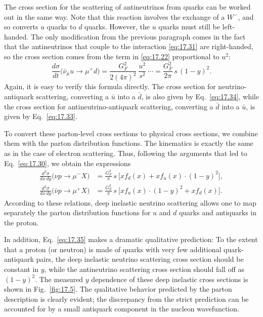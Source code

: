 The cross section for the scattering of antineutrinos from quarks can be
worked out in the same way.  Note that this reaction involves the exchange of
a $W^{-}$, and so converts $u$ quarks to $d$ quarks.  However, the $u$ quarks
must still be left-handed.  The only modification from the previous paragraph
comes in the fact that the antineutrinos that couple to the interaction
\eqref{eq:17.31} are right-handed, so the cross section comes from the term
in \eqref{eq:17.22} proportional to $u^2$:
\begin{equation}
  \frac{d\sigma}{dt}\bigl( \bar{\nu}_\mu u \to \mu^{+}d \bigr)
  = \frac{G_F^2}{2(4\pi)^2}\ \frac{u^2}{s^2}\ \cdots
  = \frac{G_F^2}{2\pi}\,s\,(1-y)^2 .
  \label{eq:17.34}
\end{equation}
Again, it is easy to verify this formula directly.  The cross section for
neutrino-antiquark scattering, converting a $\bar{u}$ into a $\bar{d}$, is
also given by Eq.~\eqref{eq:17.34}, while the cross section for
antineutrino-antiquark scattering, converting a $\bar{d}$ into a $\bar{u}$,
is given by Eq.~\eqref{eq:17.33}.

To convert these parton-level cross sections to physical cross sections, we
combine them with the parton distribution functions.  The kinematics is
exactly the same as in the case of electron scattering.  Thus, following the
arguments that led to Eq.~\eqref{eq:17.30}, we obtain the expressions
\begin{equation}
  \begin{aligned}
    \frac{d^2\sigma}{dx\,dy}\bigl( \nu p \to \mu^{-}X \bigr)
    &= \frac{G_F^2}{\pi}\,s\ \bigl[ xf_d(x) + xf_u(x)\cdot(1-y)^2 \bigr],\\
    \frac{d^2\sigma}{dx\,dy}\bigl( \bar{\nu} p \to \mu^{+}X \bigr)
    &= \frac{G_F^2}{\pi}\,s\ \bigl[ xf_u(x)\cdot(1-y)^2 + xf_d(x) \bigr].
  \end{aligned}
  \label{eq:17.35}
\end{equation}
According to these relations, deep inelastic neutrino scattering allows one to
map separately the parton distribution functions for $u$ and $d$ quarks and
antiquarks in the proton.

In addition, Eq.~\eqref{eq:17.35} makes a dramatic qualitative prediction: To
the extent that a proton (or neutron) is made of quarks with very few
additional quark-antiquark pairs, the deep inelastic neutrino scattering
cross section should be constant in $y$, while the antineutrino scattering
cross section should fall off as $(1-y)^2$.  The measured $y$ dependence of
these deep inelastic cross sections is shown in Fig.~\ref{fig:17.5}.  The
qualitative behavior predicted by the parton description is clearly evident;
the discrepancy from the strict prediction can be accounted for by a small
antiquark component in the nucleon wavefunction.


